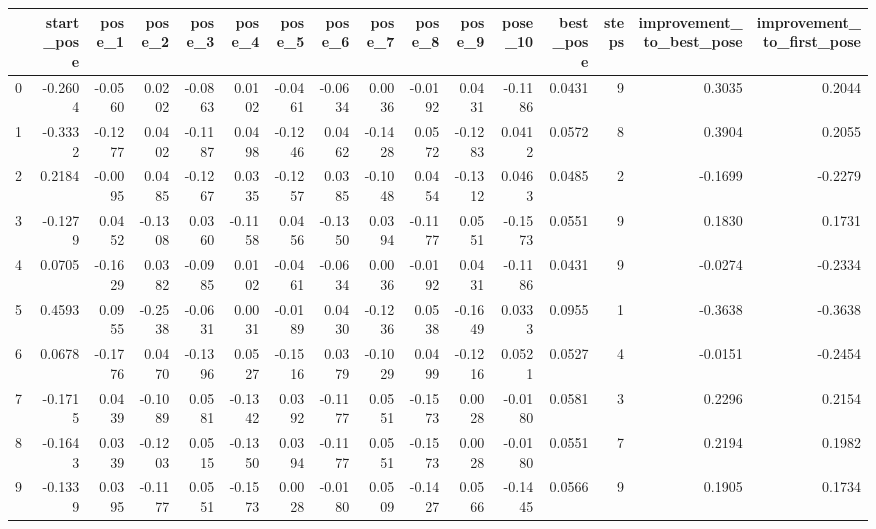 \begin{tabular}{lrrrrrrrrrrrrrrr}
\toprule
{} &  start\_pose &  pose\_1 &  pose\_2 &  pose\_3 &  pose\_4 &  pose\_5 &  pose\_6 &  pose\_7 &  pose\_8 &  pose\_9 &  pose\_10 &  best\_pose &  steps &  improvement\_to\_best\_pose &  improvement\_to\_first\_pose \\
\midrule
0 &     -0.2604 & -0.0560 &  0.0202 & -0.0863 &  0.0102 & -0.0461 & -0.0634 &  0.0036 & -0.0192 &  0.0431 &  -0.1186 &     0.0431 &      9 &                    0.3035 &                     0.2044 \\
1 &     -0.3332 & -0.1277 &  0.0402 & -0.1187 &  0.0498 & -0.1246 &  0.0462 & -0.1428 &  0.0572 & -0.1283 &   0.0412 &     0.0572 &      8 &                    0.3904 &                     0.2055 \\
2 &      0.2184 & -0.0095 &  0.0485 & -0.1267 &  0.0335 & -0.1257 &  0.0385 & -0.1048 &  0.0454 & -0.1312 &   0.0463 &     0.0485 &      2 &                   -0.1699 &                    -0.2279 \\
3 &     -0.1279 &  0.0452 & -0.1308 &  0.0360 & -0.1158 &  0.0456 & -0.1350 &  0.0394 & -0.1177 &  0.0551 &  -0.1573 &     0.0551 &      9 &                    0.1830 &                     0.1731 \\
4 &      0.0705 & -0.1629 &  0.0382 & -0.0985 &  0.0102 & -0.0461 & -0.0634 &  0.0036 & -0.0192 &  0.0431 &  -0.1186 &     0.0431 &      9 &                   -0.0274 &                    -0.2334 \\
5 &      0.4593 &  0.0955 & -0.2538 & -0.0631 &  0.0031 & -0.0189 &  0.0430 & -0.1236 &  0.0538 & -0.1649 &   0.0333 &     0.0955 &      1 &                   -0.3638 &                    -0.3638 \\
6 &      0.0678 & -0.1776 &  0.0470 & -0.1396 &  0.0527 & -0.1516 &  0.0379 & -0.1029 &  0.0499 & -0.1216 &   0.0521 &     0.0527 &      4 &                   -0.0151 &                    -0.2454 \\
7 &     -0.1715 &  0.0439 & -0.1089 &  0.0581 & -0.1342 &  0.0392 & -0.1177 &  0.0551 & -0.1573 &  0.0028 &  -0.0180 &     0.0581 &      3 &                    0.2296 &                     0.2154 \\
8 &     -0.1643 &  0.0339 & -0.1203 &  0.0515 & -0.1350 &  0.0394 & -0.1177 &  0.0551 & -0.1573 &  0.0028 &  -0.0180 &     0.0551 &      7 &                    0.2194 &                     0.1982 \\
9 &     -0.1339 &  0.0395 & -0.1177 &  0.0551 & -0.1573 &  0.0028 & -0.0180 &  0.0509 & -0.1427 &  0.0566 &  -0.1445 &     0.0566 &      9 &                    0.1905 &                     0.1734 \\
\bottomrule
\end{tabular}
